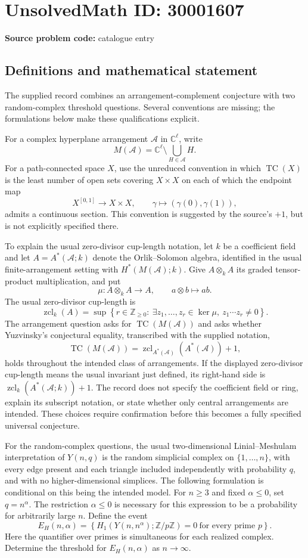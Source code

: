 \documentclass[11pt]{article}
\newcommand{\Z}{\mathbb{Z}}
\newcommand{\C}{\mathbb{C}}
\begin{document}
\section*{UnsolvedMath ID: 30001607}
\textbf{Source problem code:} catalogue entry
\subsection{Definitions and mathematical statement}
The supplied record combines an arrangement-complement conjecture with two random-complex threshold questions. Several conventions are missing; the formulations below make these qualifications explicit.

For a complex hyperplane arrangement \(\mathcal A\) in \(\C^\ell\), write
\[
M(\mathcal A)=\C^\ell\setminus\bigcup_{H\in\mathcal A}H.
\]
For a path-connected space \(X\), use the unreduced convention in which \(\operatorname{TC}(X)\) is the least number of open sets covering \(X\times X\) on each of which the endpoint map
\[
X^{[0,1]}\longrightarrow X\times X,\qquad \gamma\longmapsto(\gamma(0),\gamma(1)),
\]
admits a continuous section. This convention is suggested by the source's \(+1\), but is not explicitly specified there.

To explain the usual zero-divisor cup-length notation, let \(k\) be a coefficient field and let \(A=A^*(\mathcal A;k)\) denote the Orlik--Solomon algebra, identified in the usual finite-arrangement setting with \(H^*(M(\mathcal A);k)\). Give \(A\otimes_k A\) its graded tensor-product multiplication, and put
\[
\mu:A\otimes_k A\longrightarrow A,\qquad a\otimes b\longmapsto ab.
\]
The usual zero-divisor cup-length is
\[
\operatorname{zcl}_k(A)=\sup\left\{r\in\Z_{\geq0}:\ \exists z_1,\ldots,z_r\in\ker\mu,\ z_1\cdots z_r\ne0\right\}.
\]
The arrangement question asks for \(\operatorname{TC}(M(\mathcal A))\) and asks whether Yuzvinsky's conjectural equality, transcribed with the supplied notation,
\[
\operatorname{TC}(M(\mathcal A))
=\operatorname{zcl}_{A^*(\mathcal A)}(A^*(\mathcal A))+1,
\]
holds throughout the intended class of arrangements. If the displayed zero-divisor cup-length means the usual invariant just defined, its right-hand side is \(\operatorname{zcl}_k(A^*(\mathcal A;k))+1\). The record does not specify the coefficient field or ring, explain its subscript notation, or state whether only central arrangements are intended. These choices require confirmation before this becomes a fully specified universal conjecture.

For the random-complex questions, the usual two-dimensional Linial--Meshulam interpretation of \(Y(n,q)\) is the random simplicial complex on \(\{1,\ldots,n\}\), with every edge present and each triangle included independently with probability \(q\), and with no higher-dimensional simplices. The following formulation is conditional on this being the intended model. For \(n\geq3\) and fixed \(\alpha\leq0\), set \(q=n^\alpha\). The restriction \(\alpha\leq0\) is necessary for this expression to be a probability for arbitrarily large \(n\). Define the event
\[
E_H(n,\alpha)=\left\{H_1(Y(n,n^\alpha);\Z/p\Z)=0\ \text{for every prime }p\right\}.
\]
Here the quantifier over primes is simultaneous for each realized complex. Determine the threshold for \(E_H(n,\alpha)\) as \(n\to\infty\).
\end{document}
